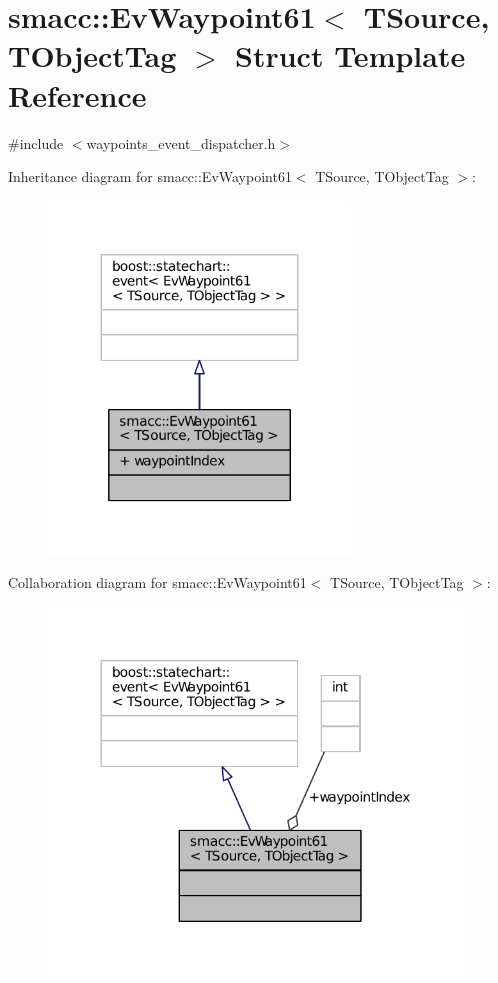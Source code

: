 \hypertarget{structsmacc_1_1EvWaypoint61}{}\section{smacc\+:\+:Ev\+Waypoint61$<$ T\+Source, T\+Object\+Tag $>$ Struct Template Reference}
\label{structsmacc_1_1EvWaypoint61}


{\ttfamily \#include $<$waypoints\+\_\+event\+\_\+dispatcher.\+h$>$}



Inheritance diagram for smacc\+:\+:Ev\+Waypoint61$<$ T\+Source, T\+Object\+Tag $>$\+:
\nopagebreak
\begin{figure}[H]
\begin{center}
\leavevmode
\includegraphics[width=227pt]{structsmacc_1_1EvWaypoint61__inherit__graph}
\end{center}
\end{figure}


Collaboration diagram for smacc\+:\+:Ev\+Waypoint61$<$ T\+Source, T\+Object\+Tag $>$\+:
\nopagebreak
\begin{figure}[H]
\begin{center}
\leavevmode
\includegraphics[width=312pt]{structsmacc_1_1EvWaypoint61__coll__graph}
\end{center}
\end{figure}
